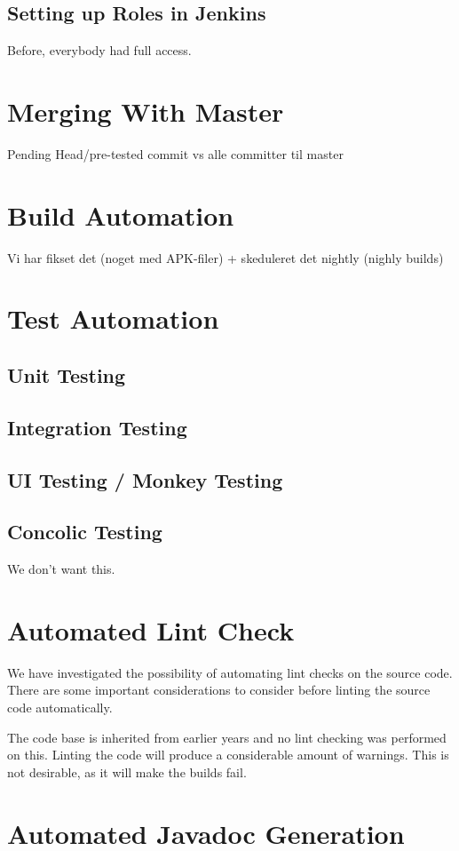 \subsection{Setting up Roles in Jenkins}
Before, everybody had full access.

\section{Merging With Master}\label{sec:branching_strategy}
Pending Head/pre-tested commit vs alle committer til master

\section{Build Automation}\label{sec:build_automation}
Vi har fikset det (noget med APK-filer) + skeduleret det nightly (nighly builds)

\section{Test Automation}\label{sec:test_automation}
\subsection{Unit Testing}
\subsection{Integration Testing}
\subsection{UI Testing / Monkey Testing}
\subsection{Concolic Testing}
We don't want this.

\section{Automated Lint Check}\label{sec:automated_lint}
We have investigated the possibility of automating lint checks on the source code. There are some important considerations to consider before linting the source code automatically.


The code base is inherited from earlier years and no lint checking was performed on this. Linting the code will produce a considerable amount of warnings. This is not desirable, as it will make the builds fail.



\section{Automated Javadoc Generation}\label{sec:automated_documentation_gen}

